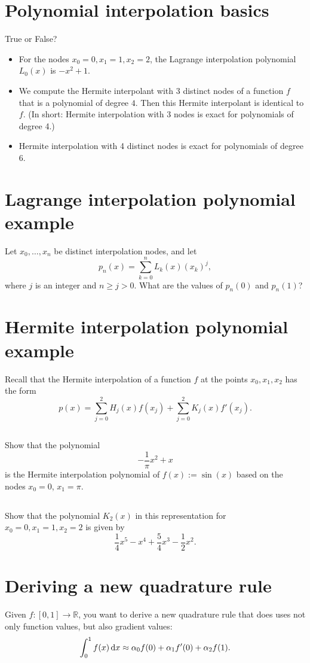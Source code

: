 \documentclass[11pt,letterpaper]{article}
\begin{document}
\section{Polynomial interpolation basics}
True or False?
\begin{itemize}
\item For the nodes $x_0=0, x_1=1, x_2= 2$, the
  Lagrange interpolation polynomial $L_0(x)$ is $-x^2 + 1$.
\item We compute the Hermite interpolant with 3 distinct nodes of
  a function $f$ that is a polynomial of degree $4$. Then this
  Hermite interpolant is identical to $f$. (In short: Hermite
  interpolation with 3 nodes is exact for polynomials of degree 4.)
\item Hermite interpolation with 4 distinct nodes is exact for
  polynomials of degree 6.
\end{itemize}

\section{Lagrange interpolation polynomial example}
Let $x_0,\ldots, x_n$ be distinct interpolation nodes, and let
  $$
  p_n(x) = \sum^n_{k=0}L_{k}(x)(x_k)^j,
  $$
  where $j$ is an integer and $n \geq j>0$.
  What are the values of $p_n(0)$ and $p_n(1)$?

\section{Hermite interpolation polynomial example}
Recall that the Hermite interpolation of a function $f$ at the points $x_0,x_1,x_2$ has the form 
$$p(x) = \sum_{j=0}^2H_j(x)f(x_j)
+ \sum_{j=0}^2K_j(x)f'(x_j).$$ 
  
\subsection{}
Show that the polynomial
$$ -\frac{1}{\pi}x^2 + x$$ 
is the Hermite interpolation polynomial of $f(x):=\sin(x)$ based on the nodes $x_0=0$, $x_1=\pi$.
  
\subsection{}
Show that the polynomial $K_2(x)$ in
this representation for $x_0=0,x_1=1,x_2=2$ is given by
$$
\frac{1}{4}x^5 - x^4 + \frac{5}{4}x^3 - \frac{1}{2}x^2.
$$

\newpage
\section{Deriving a new quadrature rule}
Given $f:[0,1]\rightarrow \mathbb{R}$, you want to derive a new
  quadrature rule that does uses not only function values, but also
  gradient values:
\begin{align}
    \int_0^1 f(x)\,\mathrm{d} x \approx \alpha_0 f(0) + \alpha_1 f'(0) + \alpha_2 f(1). \label{eq:11_3a}
\end{align}
  
\end{document}
